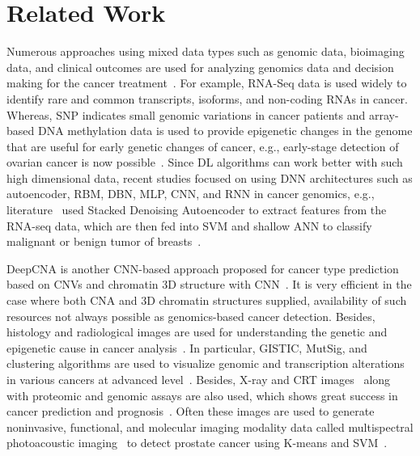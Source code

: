 \section{Related Work}\label{chapter_3:rw}
Numerous approaches using mixed data types such as genomic data, bioimaging data, and clinical outcomes are used for analyzing genomics data and decision making for the cancer treatment~\cite{min}. For example, RNA-Seq data is used widely to identify rare and common transcripts, isoforms, and non-coding RNAs in cancer. Whereas, SNP indicates small genomic variations in cancer patients and array-based DNA methylation data is used to provide epigenetic changes in the genome that are useful for early genetic changes of cancer, e.g., early-stage detection of ovarian cancer is now possible~\cite{82Tomczak,95Gaul}. Since DL algorithms can work better with such high dimensional data, recent studies focused on using DNN architectures such as autoencoder, RBM, DBN, MLP, CNN, and RNN in cancer genomics, e.g., literature~\cite{17Danaee} used Stacked Denoising Autoencoder to extract features from the RNA-seq data, which are then fed into SVM and shallow ANN to classify malignant or benign tumor of breasts~\cite{18Chen}. 

\hspace*{3.5mm} DeepCNA is another CNN-based approach proposed for cancer type prediction based on CNVs and chromatin 3D structure with CNN~\cite{yuan2018cancer}. It is very efficient in the case where both CNA and 3D chromatin structures supplied, availability of such resources not always possible as genomics-based cancer detection. Besides, histology and radiological images are used for understanding the genetic and epigenetic cause in cancer analysis~\cite{yuan2018cancer,20Rajanna,23Zheng}. In particular, GISTIC, MutSig, and clustering algorithms are used to visualize genomic and transcription alterations in various cancers at advanced level~\cite{wb}. Besides, X-ray and CRT images~\cite{25Cruz} along with proteomic and genomic assays are also used, which shows great success in cancer prediction and prognosis~\cite{28Zhou}. Often these images are used to generate noninvasive, functional, and molecular imaging modality data called multispectral photoacoustic imaging~\cite{20Rajanna} to detect prostate cancer using K-means and SVM~\cite{23Zheng}. 

